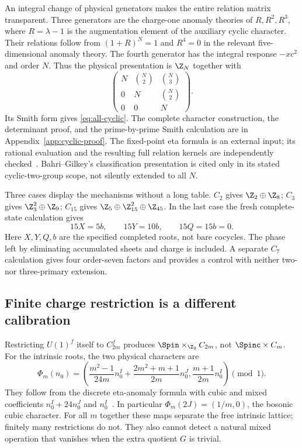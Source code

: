 An integral change of physical generators makes the entire relation matrix transparent. Three generators are the charge-one anomaly theories of $R,R^2,R^3$, where $R=\lambda-1$ is the augmentation element of the auxiliary cyclic character. Their relations follow from $(1+R)^N=1$ and $R^4=0$ in the relevant five-dimensional anomaly theory. The fourth generator has the integral response $-xc^2$ and order $N$. Thus the physical presentation is $\Z_N$ together with
\begin{equation}\label{eq:cyclic-Toeplitz}
\begin{pmatrix}
N&\binom N2&\binom N3\\
0&N&\binom N2\\
0&0&N
\end{pmatrix}.
\end{equation}
Its Smith form gives \eqref{eq:all-cyclic}. The complete character construction, the determinant proof, and the prime-by-prime Smith calculation are in Appendix~\ref{app:cyclic-proof}. The fixed-point eta formula is an external input; its rational evaluation and the resulting full relation kernels are independently checked~\cite{BahriGilkey,Hsieh}. Bahri--Gilkey's classification presentation is cited only in its stated cyclic-two-group scope, not silently extended to all $N$.

Three cases display the mechanisms without a long table. $C_2$ gives $\Z_2\oplus\Z_8$; $C_3$ gives $\Z_3^2\oplus\Z_9$; $C_{15}$ gives $\Z_5\oplus\Z_{15}^2\oplus\Z_{45}$. In the last case the fresh complete-state calculation gives
\begin{equation}\label{eq:C15-relations}
15X=5b,\qquad15Y=10b,\qquad15Q=15b=0.
\end{equation}
Here $X,Y,Q,b$ are the specified completed roots, not bare cocycles. The phase left by eliminating accumulated sheets and charge is included. A separate $C_7$ calculation gives four order-seven factors and provides a control with neither two- nor three-primary extension.

\subsection{Finite charge restriction is a different calibration}\label{v14:restriction}
Restricting $U(1)^f$ itself to $C_{2m}^f$ produces $\Spin\times_{\Z_2}C_{2m}$, not $\Spinc\times C_m$. For the intrinsic roots, the two physical characters are
\begin{equation}\label{eq:finite-charge-map}
\Phi_m(n_0)=\left(
\frac{m^2-1}{24m}n_0^I+\frac{2m^2+m+1}{2m}n_0^J,
\frac{m+1}{2m}n_0^I\right)\pmod1.
\end{equation}
They follow from the discrete eta-anomaly formula with cubic and mixed coefficients $n_0^I+24n_0^J$ and $n_0^I$~\cite{Hsieh}. In particular $\Phi_m(2J)=(1/m,0)$, the bosonic cubic character. For all $m$ together these maps separate the free intrinsic lattice; finitely many restrictions do not. They also cannot detect a natural mixed operation that vanishes when the extra quotient $G$ is trivial.

